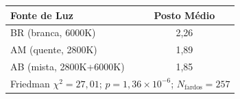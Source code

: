 \begin{tabular}{lcc}
\toprule
Fonte de Luz & Posto Médio \\
\midrule
BR (branca, 6000K) & 2,26 \\
AM (quente, 2800K) & 1,89 \\
AB (mista, 2800K+6000K) & 1,85 \\
\midrule
\multicolumn{3}{l}{\footnotesize Friedman $\chi^2 = 27{,}01$; $p = 1{,}36 \times 10^{-6}$; $N_{\text{fardos}} = 257$} \\
\bottomrule
\end{tabular}